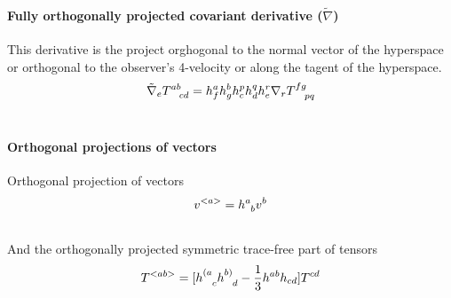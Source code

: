 \documentclass[letterpaper,10pt,english]{sphinxmanual}
\begin{document}
{\paragraph{Fully orthogonally projected covariant derivative ($\tilde \nabla$)}
\label{GeneralRelativity:fully-orthogonally-projected-covariant-derivative}
This derivative is the project orghogonal to the normal vector of the hyperspace or orthogonal to the observer's 4-velocity or along the tagent of the hyperspace.
\begin{gather}
\begin{split}\begin{equation}
     \tilde\nabla_e T^{ab}_{\phantom{ab}cd} = h^a_f h^b_gh^p_ch^q_dh^r_e \nabla_r T^{fg}_{\phantom{fg}pq}
\end{equation}\end{split}\notag\\\begin{split}\end{split}\notag
\end{gather}

\paragraph{Orthogonal projections of vectors}
\label{GeneralRelativity:orthogonal-projections-of-vectors}
Orthogonal projection of vectors
\begin{gather}
\begin{split}\begin{equation}
v^{<a>}      = h^a_{\phantom a b} v^b
\end{equation}\end{split}\notag\\\begin{split}\end{split}\notag
\end{gather}
And the orthogonally projected symmetric trace-free part of tensors
\begin{gather}
\begin{split}\begin{equation}
     T^{<ab>} = [h^{(a}_{\phantom {(a} c} h^{b)}_{\phantom{b)}d} - \frac{1}{3} h^{ab} h_{cd} ] T^{cd}
\end{equation}\end{split}\notag\\\begin{split}\end{split}\notag
\end{gather}

}
\end{document}
